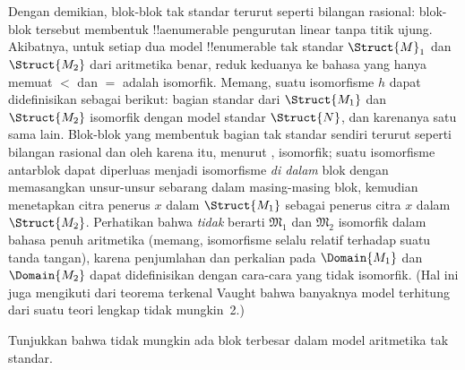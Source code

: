 \documentclass[../../../include/open-logic-section]{subfiles}
\begin{document}
Dengan demikian, blok-blok tak standar terurut seperti bilangan rasional:
blok-blok tersebut membentuk !!a{enumerable} pengurutan linear tanpa titik
ujung. Akibatnya, untuk setiap dua model !!{enumerable} tak standar
$\Struct{M}_1$ dan $\Struct{M_2}$ dari aritmetika benar, reduk keduanya ke
bahasa yang hanya memuat $<$ dan $=$ adalah isomorfik. Memang, suatu
isomorfisme $h$ dapat didefinisikan sebagai berikut: bagian standar dari
$\Struct{M_1}$ dan $\Struct{M_2}$ isomorfik dengan model standar
$\Struct{N}$, dan karenanya satu sama lain. Blok-blok yang membentuk bagian
tak standar sendiri terurut seperti bilangan rasional dan oleh karena itu,
menurut , isomorfik; suatu isomorfisme antarblok
dapat diperluas menjadi isomorfisme \emph{di dalam} blok dengan memasangkan
unsur-unsur sebarang dalam masing-masing blok, kemudian menetapkan citra
penerus $x$ dalam $\Struct{M_1}$ sebagai penerus citra $x$ dalam
$\Struct{M_2}$. Perhatikan bahwa \emph{tidak} berarti $\mathfrak{M}_1$ dan
$\mathfrak{M}_2$ isomorfik dalam bahasa penuh aritmetika (memang,
isomorfisme selalu relatif terhadap suatu tanda tangan), karena penjumlahan
dan perkalian pada $\Domain{M_1}$ dan $\Domain{M_2}$ dapat didefinisikan
dengan cara-cara yang tidak isomorfik. (Hal ini juga mengikuti dari teorema
terkenal Vaught bahwa banyaknya model terhitung dari suatu teori lengkap
tidak mungkin~2.)

\begin{prob}
Tunjukkan bahwa tidak mungkin ada blok terbesar dalam model aritmetika tak
standar.
\end{prob}
\end{document}
